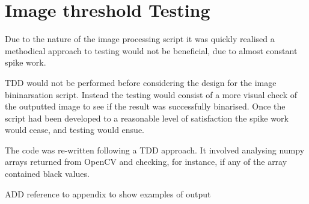 \section{Image threshold Testing}
Due to the nature of the image processing script it was quickly realised a methodical approach to testing would not be beneficial, due to almost constant spike work.

TDD would not be performed before considering the design for the image bininarsation script. Instead the testing would consist of a more visual check of the outputted image to see if the result was successfully binarised. Once the script had been developed to a reasonable level of satisfaction the spike work would cease, and testing would ensue.

The code was re-written following a TDD approach. It involved analysing numpy arrays returned from OpenCV and checking, for instance, if any of the array contained black values.

ADD reference to appendix to show examples of output
